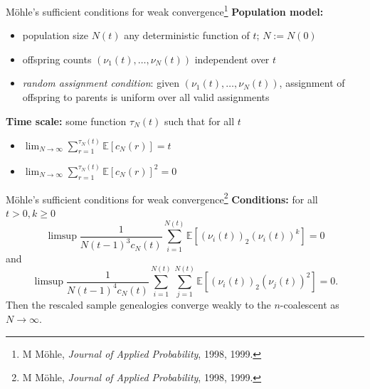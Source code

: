 \documentclass[aspectratio=169,fleqn]{beamer}
\theoremstyle{definition}
\newcommand{\E}{\mathbb{E}}
\begin{document}
\begin{frame}{M\"ohle's sufficient conditions for weak convergence\footnote[frame]{M M\"ohle, \textit{Journal of Applied Probability}, 1998, 1999.}}
    \textbf{Population model:}
    \begin{itemize}
	\item population size $N(t)$ any deterministic function of $t$; $N:=N(0)$
	\item offspring counts $(\nu_1(t), \dots, \nu_N(t))$ independent over $t$
	\item \textit{random assignment condition}: given $(\nu_1(t), \dots, \nu_N(t))$, assignment of offspring to parents is uniform over all valid assignments
	\end{itemize}
	\textbf{Time scale:} some function $\tau_N(t)$ such that for all $t$
	\begin{itemize}
	\item $\lim_{N\to\infty} \sum_{r=1}^{\tau_N(t)} \E[ c_N(r) ] = t$ 
	\item $\lim_{N\to\infty} \sum_{r=1}^{\tau_N(t)} \E[ c_N(r) ]^2 = 0$ 
	\end{itemize}
\end{frame}
\addtocounter{footnote}{-1}
\begin{frame}{M\"ohle's sufficient conditions for weak convergence\footnote[frame]{M M\"ohle, \textit{Journal of Applied Probability}, 1998, 1999.}}
    \textbf{Conditions:} for all $t>0, k\geq 0$
    \begin{equation*}
    \limsup \frac{1}{N(t-1)^3 c_N(t)} \sum_{i=1}^{N(t)} \E[ (\nu_i(t))_2 (\nu_i(t))^k ] =0
    \end{equation*}
    and
    \begin{equation*}
    \limsup \frac{1}{N(t-1)^4 c_N(t)} \sum_{i=1}^{N(t)} \sum_{j=1}^{N(t)} \E[ (\nu_i(t))_2 (\nu_j(t))^2 ] =0 .
    \end{equation*}
    Then the rescaled sample genealogies converge weakly to the $n$-coalescent as $N\to\infty$.
\end{frame}
\end{document}
